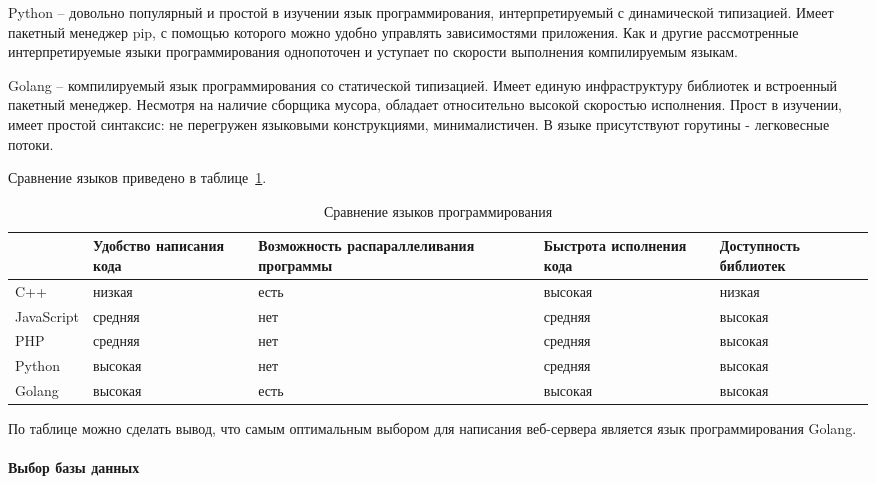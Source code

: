 Python – довольно популярный и простой в изучении язык
программирования, интерпретируемый с динамической типизацией. Имеет
пакетный менеджер pip, с помощью которого можно удобно управлять
зависимостями приложения. Как и другие рассмотренные интерпретируемые
языки программирования однопоточен и уступает по скорости выполнения
компилируемым языкам.

Golang – компилируемый язык программирования со статической
типизацией. Имеет единую инфраструктуру библиотек и встроенный
пакетный менеджер. Несмотря на наличие сборщика мусора, обладает
относительно высокой скоростью исполнения. Прост в изучении, имеет
простой синтаксис: не перегружен языковыми конструкциями,
минималистичен. В языке присутствуют горутины - легковесные потоки.

Сравнение языков приведено в таблице~\ref{t:comp-lang}.

\begin{table}[ht]
	\Large
	\caption{Сравнение языков программирования}
	\label{t:comp-lang}
	\centering
	\begin{tabularx}{\textwidth}
		{|>{}X
		|>{\centering\arraybackslash}X
		|>{\centering\arraybackslash}X
		|>{\centering\arraybackslash}X
		|>{\centering\arraybackslash}X|}
		\hline
		                                        &
		Удобство написания кода                 &
		Возможность распараллеливания программы &
		Быстрота исполнения кода                &
		Доступность библиотек                                                        \\
		\hline
		C++
		                                        & низкая  & есть & высокая & низкая  \\
		\hline
		JavaScript
		                                        & средняя & нет  & средняя & высокая \\
		\hline
		PHP
		                                        & средняя & нет  & средняя & высокая \\
		\hline
		Python
		                                        & высокая & нет  & средняя & высокая \\
		\hline
		Golang
		                                        & высокая & есть & высокая & высокая \\
		\hline
	\end{tabularx}
\end{table}


По таблице можно сделать вывод, что самым оптимальным выбором для
написания веб-сервера является язык программирования Golang.


\paragraph{Выбор базы данных}

